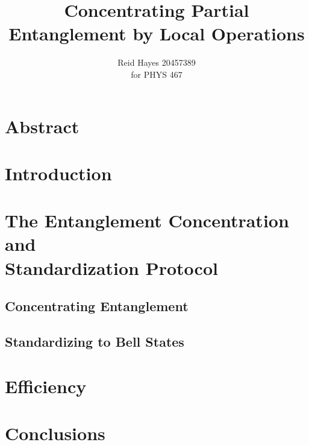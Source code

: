 \documentclass[12pt,letterpaper, titlepage]{article}
\author{Reid Hayes 20457389\\
for PHYS 467}
\title{Concentrating Partial Entanglement by Local Operations}
\begin{document}
\maketitle
\section{Abstract}

\section{Introduction}


\section{The Entanglement Concentration and \\Standardization Protocol}
\subsection{Concentrating Entanglement}
\label{sec:concentrating}


\subsection{Standardizing to Bell States}
\label{sec:standardizing}

\section{Efficiency}

\pagebreak
\section{Conclusions}

\pagebreak
\printbibliography
\end{document}
